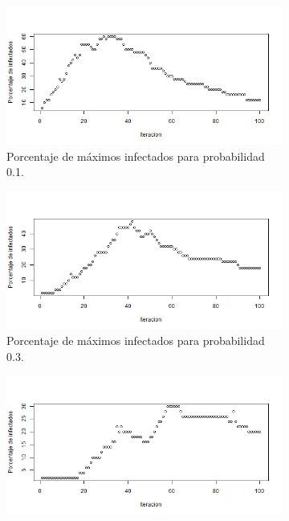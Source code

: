 \documentclass{article}
\begin{document}
\begin{figure}[H]
	\centering
	\begin{subfigure}[b]{0.45\linewidth}
		\includegraphics[width=\linewidth]{p6e01.png}
		\caption{Porcentaje de máximos infectados para probabilidad 0.1.}
		\label{1}
	\end{subfigure}
		\begin{subfigure}[b]{0.45\linewidth}
		\includegraphics[width=\linewidth]{p6e03.png}
		\caption{Porcentaje de máximos infectados para probabilidad 0.3.}
		\label{2}
	\end{subfigure}
		\begin{subfigure}[b]{0.45\linewidth}
			\includegraphics[width=\linewidth]{p6e05.png}

\end{subfigure}
\end{figure}
\end{document}
